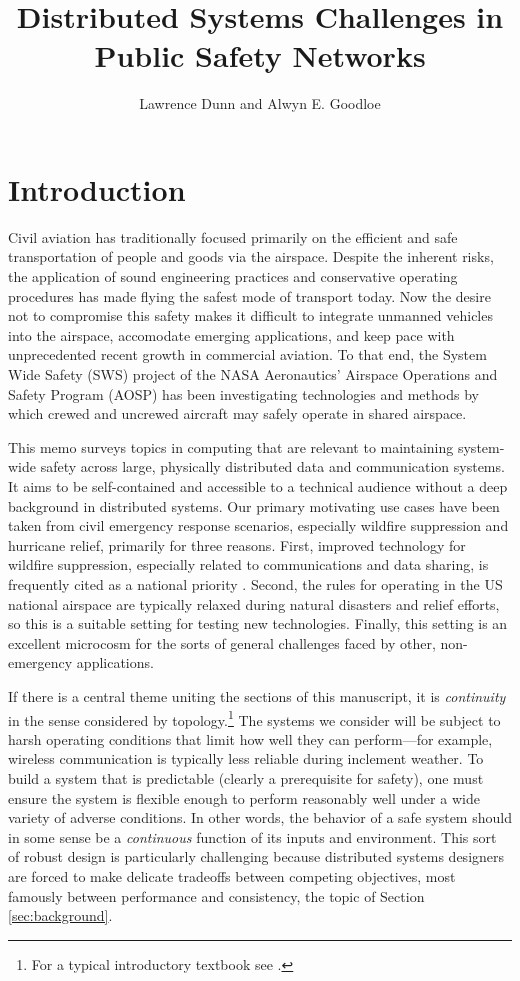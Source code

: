 \documentclass[]             %
{NASA}                       %
\title{Distributed Systems Challenges in Public Safety Networks}
\author{Lawrence Dunn and Alwyn E. Goodloe}
\theoremstyle{definition}
\begin{document}
\newpage
\setcounter{tocdepth}{2}
\tableofcontents
\newpage

\section{Introduction}
\label{sec:introduction}
Civil aviation has traditionally focused primarily on the efficient
and safe transportation of people and goods via the airspace. Despite
the inherent risks, the application of sound engineering practices and
conservative operating procedures has made flying the safest mode of
transport today. Now the desire not to compromise this safety makes it
difficult to integrate unmanned vehicles into the airspace, accomodate
emerging applications, and keep pace with unprecedented recent growth
in commercial aviation. To that end, the System Wide Safety (SWS)
project of the NASA Aeronautics' Airspace Operations and Safety
Program (AOSP) has been investigating technologies and methods by
which crewed and uncrewed aircraft may safely operate in shared
airspace.

This memo surveys topics in computing that are relevant to maintaining
system-wide safety across large, physically distributed data and
communication systems. It aims to be self-contained and accessible to
a technical audience without a deep background in distributed
systems. Our primary motivating use cases have been taken from civil
emergency response scenarios, especially wildfire suppression and
hurricane relief, primarily for three reasons. First, improved
technology for wildfire suppression, especially related to
communications and data sharing, is frequently cited as a national
priority \cite{pcast2023}.  Second, the rules for operating in the US
national airspace are typically relaxed during natural disasters and
relief efforts, so this is a suitable setting for testing new
technologies. Finally, this setting is an excellent microcosm for the
sorts of general challenges faced by other, non-emergency
applications.

If there is a central theme uniting the sections of this manuscript,
it is \emph{continuity} in the sense considered by
topology.\footnote{For a typical introductory textbook see
  \cite{mendelson2012introduction}.} The systems we consider will be
subject to harsh operating conditions that limit how well they can
perform---for example, wireless communication is typically less
reliable during inclement weather. To build a system that is
predictable (clearly a prerequisite for safety), one must ensure the
system is flexible enough to perform reasonably well under a wide
variety of adverse conditions. In other words, the behavior of a safe
system should in some sense be a \emph{continuous} function of its
inputs and environment. This sort of robust design is particularly
challenging because distributed systems designers are forced to make
delicate tradeoffs between competing objectives, most famously between
performance and consistency, the topic of Section
\ref{sec:background}.
\end{document}
